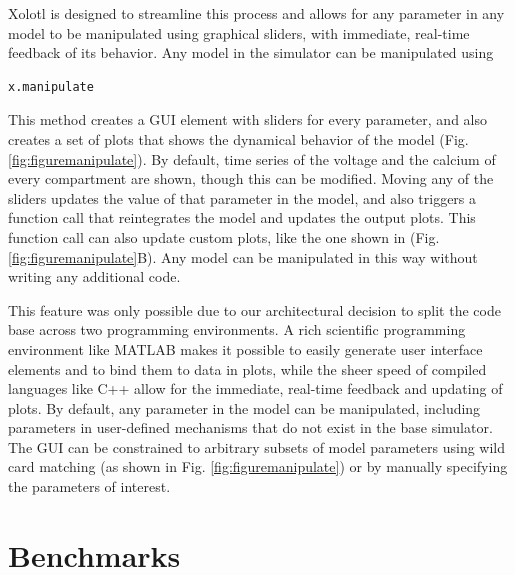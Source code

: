 \documentclass{frontiersSCNS} %
\begin{document}
Xolotl is designed to streamline this process and allows for any parameter in any model to be manipulated using graphical sliders, with immediate, real-time feedback of its behavior. Any model in the simulator can be manipulated using

\begin{lstlisting}[style=Matlab-editor]
x.manipulate 
\end{lstlisting}

This method creates a GUI element with sliders for every parameter, and also creates a set of plots that shows the dynamical behavior of the model (Fig. \ref{fig:figuremanipulate}). By default, time series of the voltage and the calcium of every compartment are shown, though this can be modified. Moving any of the sliders updates the value of that parameter in the model, and also triggers a function call that reintegrates the model and updates the output plots. This function call can also update custom plots, like the one shown in (Fig. \ref{fig:figuremanipulate}B). Any model can be manipulated in this way without writing any additional code. 

This feature was only possible due to our architectural decision to split the code base across two programming environments. A rich scientific programming environment like MATLAB makes it possible to easily generate user interface elements and to bind them to data in plots, while the sheer speed of compiled languages like C++ allow for the immediate, real-time feedback and updating of plots. By default, any parameter in the model can be manipulated, including parameters in user-defined mechanisms that do not exist in the base simulator. The GUI can be constrained to arbitrary subsets of model parameters using wild card matching (as shown in Fig. \ref{fig:figuremanipulate}) or by manually specifying the parameters of interest. 



%
%
%
%
%
%

\section{Benchmarks}
\label{benchmarks}
\end{document}
